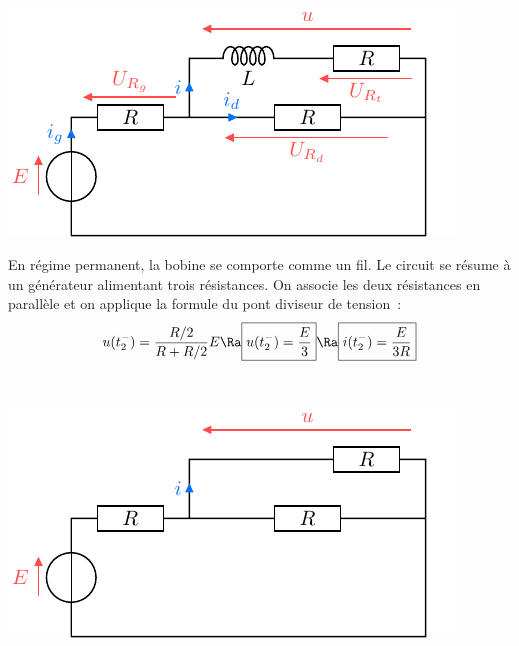 \documentclass[a4paper, 10pt, garamond, oneside]{book}
\begin{document}
{\begin{enumerate}
\begin{minipage}[t]{.49\linewidth}
		\end{minipage}
		\hfill
		\begin{minipage}[t]{.49\linewidth}
			~
			\vspace{-20pt}
			\begin{center}
				\includegraphics[width=\linewidth]{transRL_q7}
			\end{center}
		\end{minipage}
		\vspace{20pt}
		 \label{Q:perm2}\noindent
		\begin{minipage}[t]{.49\linewidth}
			En régime permanent, la bobine se comporte comme un fil. Le
			circuit se résume à un générateur alimentant trois résistances.
			On associe les deux résistances en parallèle et on applique la
			formule du pont diviseur de tension~:
			\[
				u(t_2^-)=\frac{R/2}{R+R/2}E
				\Ra
				\boxed{u(t_2^-)=\frac{E}{3}}
				\Ra
				\boxed{i(t_2^-)=\frac{E}{3R}}
			\]
		\end{minipage}
		\hfill
		\begin{minipage}[t]{.49\linewidth}
			~
			\vspace{-40pt}
			\begin{center}
				\includegraphics[width=\linewidth]{transRL_q8}

\end{center}
\end{minipage}
\end{enumerate}}
\end{document}
